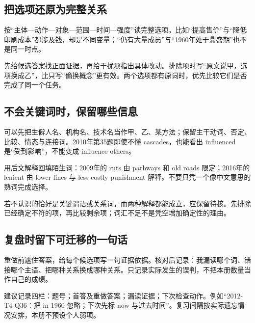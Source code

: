 \documentclass[11pt,a4paper]{article}
\begin{document}
\subsection{把选项还原为完整关系}
按“主体—动作—对象—范围—时间—强度”读完整选项。比如“提高售价”与“降低印刷成本”都涉及钱，却是不同变量；“仍有大量成员”与“1960年处于鼎盛期”也不是同一时点。\par
先给候选答案找正面证据，再给干扰项指出具体改动。排除项时写“原文说甲，选项换成乙”，比只写“偷换概念”更有效。两个选项都有原词时，优先比较它们是否完成了同一个任务。\par
\subsection{不会关键词时，保留哪些信息}
可以先把生僻人名、机构名、技术名当作甲、乙、某方法；保留主干动词、否定、比较、情态与连接词。2010年第35题即使不懂 cascades，也能看出 influenced 是“受到影响”，不能变成 influence others。\par
用后文解释回填陌生词：2009年的 ruts 由 pathways 和 old roads 限定；2016年的 lenient 由 lower fines 与 less costly punishment 解释。不要只凭一个像中文意思的熟词完成选择。\par
若不认识的恰好是关键谓语或关系词，而两种解释都能成立，应保留待核。先排除已经确定不符的项，再比较剩余项；词汇不足不是凭空增加确定性的理由。\par
\subsection{复盘时留下可迁移的一句话}
重做前遮住答案，给每个候选项写一句证据依据。核对后记录：我漏读哪个词、错接哪个主语、把哪种关系换成哪种关系。只记录实际发生的误判，不把本册数量当作自己的成绩。\par
建议记录四栏：题号；首答及重做答案；漏读证据；下次检查动作。例如“2012-T4-Q36：把 in 1960 忽略；下次先标 now 与过去时间”。复习间隔按实际遗忘情况安排，本册不预设个人弱项。\par
\end{document}
